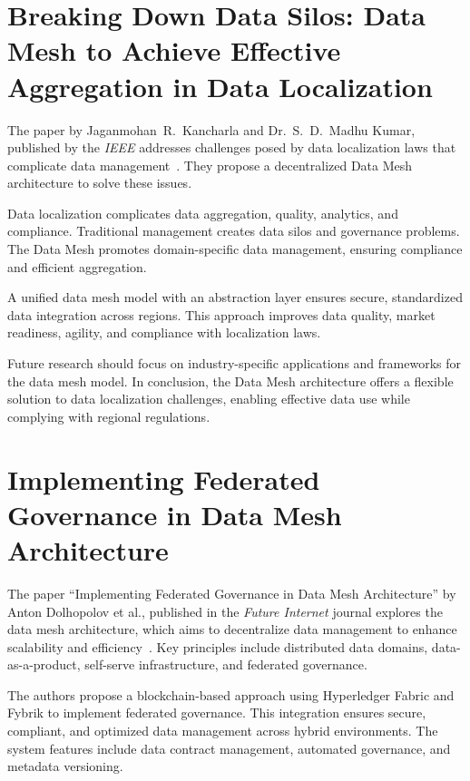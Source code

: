 \section{Breaking Down Data Silos: Data Mesh to Achieve Effective Aggregation in Data Localization}\label{sec:breaking-down-data-silos:-data-mesh-to-achieve-effective-aggregation-in-data-localization}

The paper by Jaganmohan~R.~Kancharla and Dr.~S.~D.~Madhu Kumar, published by the \textit{IEEE} addresses challenges posed by data localization laws that complicate data management~\cite{breaking_down_data_silos}.
They propose a decentralized Data Mesh architecture to solve these issues.

Data localization complicates data aggregation, quality, analytics, and compliance.
Traditional management creates data silos and governance problems.
The Data Mesh promotes domain-specific data management, ensuring compliance and efficient aggregation.

A unified data mesh model with an abstraction layer ensures secure, standardized data integration across regions.
This approach improves data quality, market readiness, agility, and compliance with localization laws.

Future research should focus on industry-specific applications and frameworks for the data mesh model.
In conclusion, the Data Mesh architecture offers a flexible solution to data localization challenges, enabling effective data use while complying with regional regulations.

\section{Implementing Federated Governance in Data Mesh Architecture}\label{sec:implementing-federated-governance-in-data-mesh-architecture}

The paper ``Implementing Federated Governance in Data Mesh Architecture'' by Anton Dolhopolov et al., published in the \textit{Future Internet} journal explores the data mesh architecture, which aims to decentralize data management to enhance scalability and efficiency~\cite{implementing_federated_governance}.
Key principles include distributed data domains, data-as-a-product, self-serve infrastructure, and federated governance.

The authors propose a blockchain-based approach using Hyperledger Fabric and Fybrik to implement federated governance. %
This integration ensures secure, compliant, and optimized data management across hybrid environments.
The system features include data contract management, automated governance, and metadata versioning.

